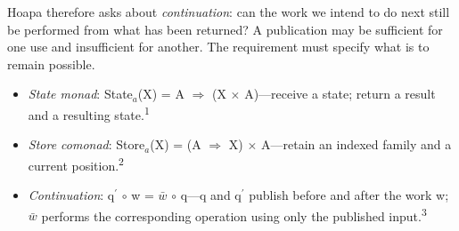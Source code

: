 \documentclass[a4paper,10pt]{article}
\begin{document}
Hoapa therefore asks about \textcolor{continuationmint}{\emph{continuation}}: can the work we intend to do next still be performed from what has been returned? A publication may be sufficient for one use and insufficient for another. The requirement must specify what is to remain possible.\par
\begin{itemize}
\item \textcolor{statemonadcerulean}{\emph{State monad}}: State\ensuremath{_a}(X) = A \ensuremath{\Rightarrow} (X \ensuremath{\times} A)—receive a state; return a result and a resulting state.\textsuperscript{1}
\item \textcolor{storecomonadtangerine}{\emph{Store comonad}}: Store\ensuremath{_a}(X) = (A \ensuremath{\Rightarrow} X) \ensuremath{\times} A—retain an indexed family and a current position.\textsuperscript{2}
\item \textcolor{continuationmint}{\emph{Continuation}}: q\ensuremath{^\prime} \ensuremath{\circ} w = \ensuremath{\bar{w}} \ensuremath{\circ} q—q and q\ensuremath{^\prime} publish before and after the work w; \ensuremath{\bar{w}} performs the corresponding operation using only the published input.\textsuperscript{3}
\end{itemize}
\end{document}
